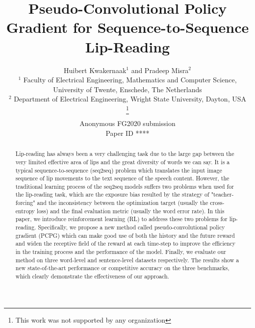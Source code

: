 \documentclass[a4paper, 10pt, conference]{ieeeconf}      %
\title{\LARGE \bf Pseudo-Convolutional Policy Gradient for Sequence-to-Sequence Lip-Reading
}
\author{\parbox{16cm}{\centering
    {\large Huibert Kwakernaak$^1$ and Pradeep Misra$^2$}\\
    {\normalsize
    $^1$ Faculty of Electrical Engineering, Mathematics and Computer Science, University of Twente, Enschede, The Netherlands\\
    $^2$ Department of Electrical Engineering, Wright State University, Dayton, USA}}
    \thanks{This work was not supported by any organization}%
}
\def\FGPaperID{****} %
\begin{document}
\ifFGfinal
\thispagestyle{empty}
\pagestyle{empty}
\else
\author{Anonymous FG2020 submission\\ Paper ID \FGPaperID \\}
\pagestyle{plain}
\fi
\maketitle



\begin{abstract}

   Lip-reading has always been a very challenging task due to the large 
   gap between the very limited effective area of lips and the great 
   diversity of words we can say. It is a typical sequence-to-sequence 
   (seq2seq) problem which translates the input image sequence of lip 
   movements to the text sequence of the speech content. However, 
   the traditional learning process of the seq2seq models suffers 
   two problems when used for the lip-reading task, which are the 
   exposure bias resulted by the strategy of "teacher-forcing" and 
   the inconsistency between the optimization target 
   (usually the cross-entropy loss) and the final evaluation metric 
   (usually the word error rate). In this paper, we introduce 
   reinforcement learning (RL) to address these two problems for 
   lip-reading. Specifically, we propose a new method called 
   pseudo-convolutional policy gradient (PCPG) which can make good 
   use of both the history and the future reward and widen the receptive 
   field of the reward at each time-step to improve the efficiency in the training process 
   and the performance of the model. Finally, we evaluate our method on three word-level and 
   sentence-level datasets respectively. The results show a new state-of-the-art performance or 
   competitive accuracy on the three benchmarks, 
   which clearly demonstrate the effectiveness of our approach.
\end{abstract}


\end{document}
